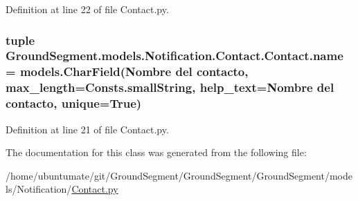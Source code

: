 Definition at line 22 of file Contact.\+py.

\hypertarget{class_ground_segment_1_1models_1_1_notification_1_1_contact_1_1_contact_a3400aa7d4127f75c2035ab4ae66831fa}{}
\subsubsection[{name}]{\setlength{\rightskip}{0pt plus 5cm}tuple Ground\+Segment.\+models.\+Notification.\+Contact.\+Contact.\+name = models.\+Char\+Field(\textquotesingle{}Nombre del contacto\textquotesingle{}, max\+\_\+length={\bf Consts.\+small\+String}, help\+\_\+text=\textquotesingle{}Nombre del contacto\textquotesingle{}, unique=True)\hspace{0.3cm}{\ttfamily [static]}}\label{class_ground_segment_1_1models_1_1_notification_1_1_contact_1_1_contact_a3400aa7d4127f75c2035ab4ae66831fa}


Definition at line 21 of file Contact.\+py.



The documentation for this class was generated from the following file\+:\begin{DoxyCompactItemize}
\item 
/home/ubuntumate/git/\+Ground\+Segment/\+Ground\+Segment/\+Ground\+Segment/models/\+Notification/\hyperlink{_contact_8py}{Contact.\+py}\end{DoxyCompactItemize}
